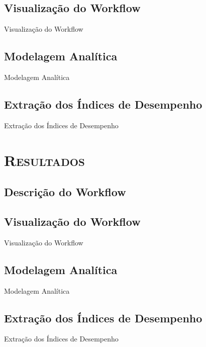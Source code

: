 \documentclass[xcolor=x11names,compress]{beamer}
\renewcommand{\(}{\begin{columns}}
\renewcommand{\)}{\end{columns}}
\newcommand{\<}[1]{\begin{column}{#1}}
\renewcommand{\>}{\end{column}}
\begin{document}
    \subsection{Visualização do Workflow}
        \begin{frame}{Visualização do Workflow}

        \end{frame}

    \subsection{Modelagem Analítica}
        \begin{frame}{Modelagem Analítica}

        \end{frame}

    \subsection{Extração dos Índices de Desempenho}
        \begin{frame}{Extração dos Índices de Desempenho}

        \end{frame}

\section{\scshape Resultados}

    \subsection{Descrição do Workflow}


    \subsection{Visualização do Workflow}
        \begin{frame}{Visualização do Workflow}

        \end{frame}

    \subsection{Modelagem Analítica}
        \begin{frame}{Modelagem Analítica}

        \end{frame}

    \subsection{Extração dos Índices de Desempenho}
        \begin{frame}{Extração dos Índices de Desempenho}

        \end{frame}
\end{document}
